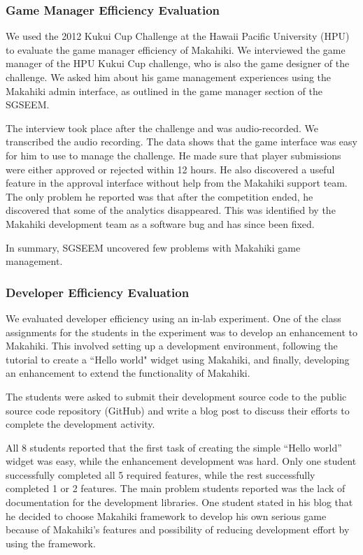 \documentclass{sigchi}
\begin{document}
\subsubsection{Game Manager Efficiency Evaluation}

We used the 2012 Kukui Cup Challenge at the Hawaii Pacific University (HPU) to evaluate
the game manager efficiency of Makahiki. We interviewed the
game manager of the HPU Kukui Cup challenge, who is also the game designer of the challenge.
We asked him about his game management experiences using the Makahiki admin
interface, as outlined in the game manager section of the SGSEEM.

The interview took place after the challenge and was audio-recorded. We transcribed the
audio recording. The data shows that the game interface was easy for him to use to manage
the challenge. He made sure that player submissions were either approved or rejected
within 12 hours. He also discovered a useful feature in the approval interface without
help from the Makahiki support team. The only problem he reported was that after the
competition ended, he discovered that some of the analytics disappeared. This was
identified by the Makahiki development team as a software bug and has since been fixed.

In summary, SGSEEM uncovered few problems with Makahiki game management. 

\subsubsection{Developer Efficiency Evaluation}

We evaluated developer efficiency using an in-lab experiment. One of the class assignments
for the students in the experiment was to develop an enhancement to Makahiki.  This
involved setting up a development environment, following the tutorial to create a ``Hello
world" widget using Makahiki, and finally, developing an enhancement to extend the
functionality of Makahiki.

The students were asked to submit their development source code to the
public source code repository (GitHub) and write a blog post to
discuss their efforts to complete the development activity.

All 8 students reported that the first task of creating the simple ``Hello world'' widget
was easy, while the enhancement development was hard. Only one student successfully
completed all 5 required features, while the rest successfully completed 1 or 2
features. The main problem students reported was the lack of documentation for the
development libraries. One student stated in his blog that he decided to choose Makahiki
framework to develop his own serious game because of Makahiki's features and possibility
of reducing development effort by using the framework.
\end{document}
